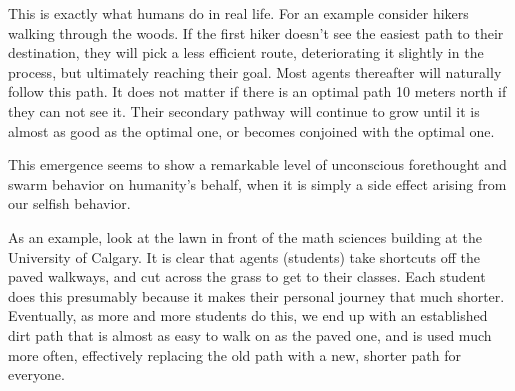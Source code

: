\documentclass[conference]{IEEEtran}
\begin{document}
This is exactly what humans do in real life. For an example consider hikers walking through the woods. If the first hiker doesn't see the easiest path to their destination, they will pick a less efficient route, deteriorating it slightly in the process, but ultimately reaching their goal. Most agents thereafter will naturally follow this path. It does not matter if there is an optimal path 10 meters north if they can not see it. Their secondary pathway will continue to grow until it is almost as good as the optimal one, or becomes conjoined with the optimal one.

This emergence seems to show a remarkable level of unconscious forethought and swarm behavior on humanity's behalf, when it is simply a side effect arising from our selfish behavior. 

As an example, look at the lawn in front of the math sciences building at the University of Calgary. It is clear that agents (students) take shortcuts off the paved walkways, and cut across the grass to get to their classes. Each student does this presumably because it makes their personal journey that much shorter. Eventually, as more and more students do this, we end up with an established dirt path that is almost as easy to walk on as the paved one, and is used much more often, effectively replacing the old path with a new, shorter path for everyone. 

%
%

\end{document}
